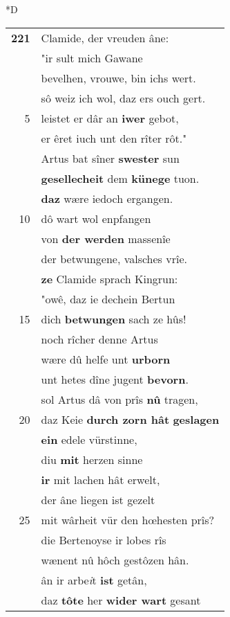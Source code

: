 \documentclass[8pt,a4paper,notitlepage]{article}
\begin{document}
\begin{table}[ht]
\begin{minipage}[t]{0.5\linewidth}
\small
\begin{center}*D
\end{center}
\begin{tabular}{rl}
\textbf{221} & Clamide, der vreuden âne:\\ 
 & "ir sult mich Gawane\\ 
 & bevelhen, vrouwe, bin ichs wert.\\ 
 & sô weiz ich wol, daz ers ouch gert.\\ 
5 & leistet er dâr an \textbf{iwer} gebot,\\ 
 & er êret iuch unt den rîter rôt."\\ 
 & Artus bat sîner \textbf{swester} sun\\ 
 & \textbf{gesellecheit} dem \textbf{künege} tuon.\\ 
 & \textbf{daz} wære iedoch ergangen.\\ 
10 & dô wart wol enpfangen\\ 
 & von \textbf{der werden} massenîe\\ 
 & der betwungene, valsches vrîe.\\ 
 & \textbf{ze} Clamide sprach Kingrun:\\ 
 & "owê, daz ie dechein Bertun\\ 
15 & dich \textbf{betwungen} sach ze hûs!\\ 
 & noch rîcher denne Artus\\ 
 & wære dû helfe unt \textbf{urborn}\\ 
 & unt hetes dîne jugent \textbf{bevorn}.\\ 
 & sol Artus dâ von prîs \textbf{nû} tragen,\\ 
20 & daz Keie \textbf{durch zorn hât} \textbf{geslagen}\\ 
 & \textbf{ein} edele vürstinne,\\ 
 & diu \textbf{mit} herzen sinne\\ 
 & \textbf{ir} mit lachen hât erwelt,\\ 
 & der âne liegen ist gezelt\\ 
25 & mit wârheit vür den hœhesten prîs?\\ 
 & die Bertenoyse ir lobes rîs\\ 
 & wænent nû hôch gestôzen hân.\\ 
 & ân ir arbe\textit{i}t \textbf{ist} getân,\\ 
 & daz \textbf{tôte} her \textbf{wider wart} gesant\\ 

\end{tabular}
\end{minipage}
\end{table}
\end{document}
